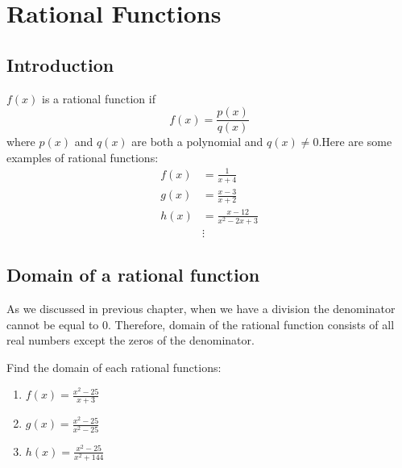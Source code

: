 \chapter{Rational Functions}
\section{Introduction}
$f(x)$ is a rational function if \[
            f(x) = \frac{p(x)}{q(x)}
\]
where $p(x)$ and $q(x)$ are both a polynomial and $q(x) \neq0$.Here are some examples of rational functions:
\begin{align*}
            f(x) &= \frac{1}{x+4}\\
            g(x) &= \frac{x-3}{x+2}\\
            h(x) &= \frac{x-12}{x^2-2x+3}\\
                 &\vdots
\end{align*}
\section{Domain of a rational function}
As we discussed in previous chapter, when we have a division the denominator cannot be equal to 0. Therefore, domain  of  the  rational  function  consists  of  all  real  numbers  except  the  zeros  of  the  denominator.
\begin{exa}
        Find the domain of each rational functions:
        \begin{enumerate}[\bfseries a.]
            \item $\displaystyle f(x)=\frac{x^2-25}{x+3}$
            \item $\displaystyle g(x)=\frac{x^2-25}{x^2-25}$
            \item $\displaystyle h(x)=\frac{x^2-25}{x^2+144}$
        \end{enumerate}
\end{exa}
\newpage            %

